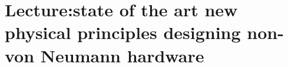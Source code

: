\section{ Lecture:state of the art new physical principles designing non-von Neumann hardware }\label{sec:q1}    
